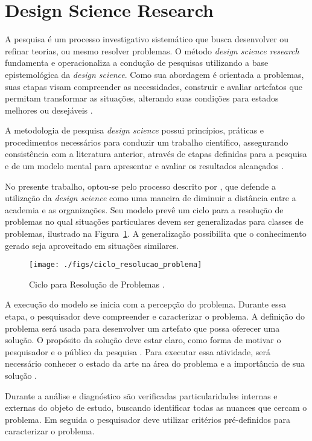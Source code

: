 \section{Design Science Research}
A pesquisa é um processo investigativo sistemático que busca desenvolver ou refinar teorias, ou mesmo resolver problemas. O método \textit{design science research} fundamenta e operacionaliza a condução de pesquisas utilizando a base epistemológica da \textit{design science}. Como sua abordagem é orientada a problemas, suas etapas visam compreender as necessidades, construir e avaliar artefatos que permitam transformar as situações, alterando suas condições para estados melhores ou desejáveis \cite{hevner-et-al-2004,dresch:2015}.

A metodologia de pesquisa \textit{design science} possui princípios, práticas e procedimentos necessários para conduzir um trabalho científico, assegurando consistência com a literatura anterior, através de etapas definidas para a pesquisa e de um modelo mental para apresentar e avaliar os resultados alcançados \cite{peffers-et-al:2007}. 

No presente trabalho, optou-se pelo processo descrito por , que defende a utilização da \textit{design science} como uma maneira de diminuir a distância entre a academia e as organizações. Seu modelo prevê um ciclo para a resolução de problemas no qual situações particulares devem ser generalizadas para classes de problemas, ilustrado na Figura~\ref{ciclo_resolucao-problema}. A generalização possibilita que o conhecimento gerado seja aproveitado em situações similares. 

\begin{figure}
	\centering
	\texttt{[image: ./figs/ciclo\_resolucao\_problema]}
	\caption{Ciclo para Resolução de Problemas \cite{vanAken-et-al:2012}.}
	\label{ciclo_resolucao-problema}
\end{figure}

A execução do modelo se inicia com a percepção do problema. Durante essa etapa, o pesquisador deve compreender e caracterizar o problema. A definição do problema será usada para desenvolver um artefato que possa oferecer uma solução. O propósito da solução deve estar claro, como forma de motivar o pesquisador e o público da pesquisa \cite{peffers-et-al:2007}. Para executar essa atividade, será necessário conhecer o estado da arte na área do problema e a importância de sua solução \cite{vanAken-et-al:2012}.

Durante a análise e diagnóstico são verificadas particularidades internas e externas do objeto de estudo, buscando identificar todas as nuances que cercam o problema. Em seguida o pesquisador deve utilizar critérios pré-definidos para caracterizar o problema.


